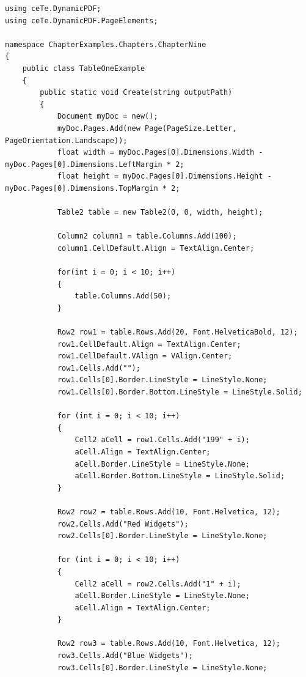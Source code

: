 \documentclass[american]{tufte-book}
\numberwithin{equation}{section}
\numberwithin{figure}{section}
\begin{document}
{\bgroup{}
\begin{lstlisting}[caption={A basic table.},label={lis:A-basic-table.},basicstyle={\footnotesize\ttfamily},breaklines=true]
using ceTe.DynamicPDF;
using ceTe.DynamicPDF.PageElements;

namespace ChapterExamples.Chapters.ChapterNine
{
    public class TableOneExample
    {
        public static void Create(string outputPath)
        {
            Document myDoc = new();
            myDoc.Pages.Add(new Page(PageSize.Letter, PageOrientation.Landscape));
            float width = myDoc.Pages[0].Dimensions.Width - myDoc.Pages[0].Dimensions.LeftMargin * 2;
            float height = myDoc.Pages[0].Dimensions.Height - myDoc.Pages[0].Dimensions.TopMargin * 2;

            Table2 table = new Table2(0, 0, width, height);

            Column2 column1 = table.Columns.Add(100);
            column1.CellDefault.Align = TextAlign.Center;
           
            for(int i = 0; i < 10; i++)
            {
                table.Columns.Add(50);
            }

            Row2 row1 = table.Rows.Add(20, Font.HelveticaBold, 12);
            row1.CellDefault.Align = TextAlign.Center;
            row1.CellDefault.VAlign = VAlign.Center;
            row1.Cells.Add("");
            row1.Cells[0].Border.LineStyle = LineStyle.None;
            row1.Cells[0].Border.Bottom.LineStyle = LineStyle.Solid;

            for (int i = 0; i < 10; i++)
            {
                Cell2 aCell = row1.Cells.Add("199" + i);
                aCell.Align = TextAlign.Center;
                aCell.Border.LineStyle = LineStyle.None;
                aCell.Border.Bottom.LineStyle = LineStyle.Solid;
            }

            Row2 row2 = table.Rows.Add(10, Font.Helvetica, 12);
            row2.Cells.Add("Red Widgets");
            row2.Cells[0].Border.LineStyle = LineStyle.None;

            for (int i = 0; i < 10; i++)
            {
                Cell2 aCell = row2.Cells.Add("1" + i);
                aCell.Border.LineStyle = LineStyle.None;
                aCell.Align = TextAlign.Center;
            }

            Row2 row3 = table.Rows.Add(10, Font.Helvetica, 12);
            row3.Cells.Add("Blue Widgets");
            row3.Cells[0].Border.LineStyle = LineStyle.None;


\end{lstlisting}}
\end{document}
